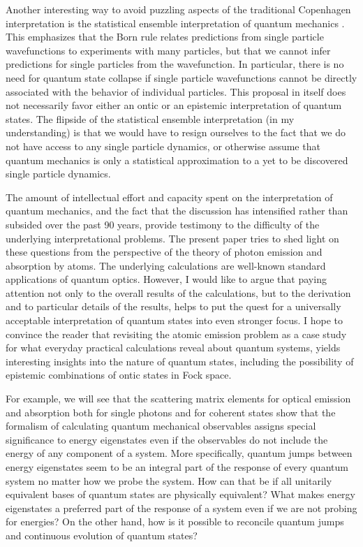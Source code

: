 \documentclass[final,3p,12pt]{elsarticle3}
\begin{document}
Another interesting way to avoid puzzling aspects of the traditional Copenhagen 
interpretation is the statistical ensemble interpretation of quantum 
mechanics \cite{ballentine1,ballentine2}. This emphasizes that the Born rule 
relates predictions from single particle wavefunctions to experiments with many 
particles, but that we cannot infer predictions for single particles from the 
wavefunction. In particular, there is no need for quantum state collapse if 
single particle wavefunctions cannot be directly associated with the behavior 
of individual particles. This proposal in itself does not necessarily favor either 
an ontic or an epistemic interpretation of quantum states. The flipside of the 
statistical ensemble interpretation (in my understanding) is that we would have 
to resign ourselves to the fact that we do not have access to any single particle 
dynamics, or otherwise assume that quantum mechanics is only a statistical 
approximation to a yet to be discovered single particle dynamics. 

The amount of intellectual effort and capacity spent on the interpretation of 
quantum mechanics, and the fact that the discussion has intensified rather than 
subsided over the past 90 years, provide testimony to the difficulty of the 
underlying interpretational problems. The present paper tries to shed light on 
these questions from the perspective of the theory of photon emission and 
absorption by atoms. The underlying calculations are well-known standard 
applications of quantum optics. However, I would like to argue that paying 
attention not only to the overall results of the calculations, but to the
derivation and to particular details of the results, helps to put the 
quest for a universally acceptable interpretation of quantum states into 
even stronger focus. I hope to convince the reader that revisiting the atomic 
emission problem as a case study for what everyday practical calculations reveal 
about quantum systems, yields interesting insights into the nature of quantum 
states, including the possibility of epistemic combinations of ontic states 
in Fock space.

 For example, we will see that the scattering matrix elements for optical 
emission and absorption both for single photons and for coherent states
show that the formalism of calculating quantum mechanical observables 
assigns special significance to energy eigenstates even if the observables
do not include the energy of any component of a system. More specifically,
quantum jumps between energy eigenstates seem to be an integral part of the 
response of every quantum system no matter how we probe the system.
How can that be if all unitarily equivalent bases of quantum states are
physically equivalent? What makes energy eigenstates a preferred part of
the response of a system even if we are not probing for energies?
On the other hand, how is it possible to reconcile quantum jumps 
and continuous evolution of quantum states?
\end{document}
